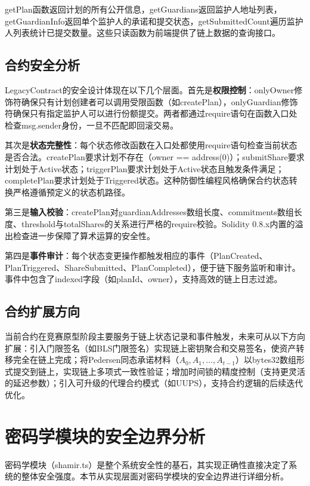 \documentclass[UTF8,a4paper,zihao=-4,openany]{ctexrep}
\begin{document}
getPlan函数返回计划的所有公开信息，getGuardians返回监护人地址列表，getGuardianInfo返回单个监护人的承诺和提交状态，getSubmittedCount遍历监护人列表统计已提交数量。这些只读函数为前端提供了链上数据的查询接口。

\subsection{合约安全分析}

LegacyContract的安全设计体现在以下几个层面。首先是\textbf{权限控制}：onlyOwner修饰符确保只有计划创建者可以调用受限函数（如createPlan），onlyGuardian修饰符确保只有指定监护人可以进行份额提交。两者都通过require语句在函数入口处检查msg.sender身份，一旦不匹配即回滚交易。

其次是\textbf{状态完整性}：每个状态修改函数在入口处都使用require语句检查当前状态是否合法。createPlan要求计划不存在（owner == address(0)）；submitShare要求计划处于Active状态；triggerPlan要求计划处于Active状态且触发条件满足；completePlan要求计划处于Triggered状态。这种防御性编程风格确保合约状态转换严格遵循预定义的状态机路径。

第三是\textbf{输入校验}：createPlan对guardianAddresses数组长度、commitments数组长度、threshold与totalShares的关系进行严格的require校验。Solidity 0.8.x内置的溢出检查进一步保障了算术运算的安全性。

第四是\textbf{事件审计}：每个状态变更操作都触发相应的事件（PlanCreated、PlanTriggered、ShareSubmitted、PlanCompleted），便于链下服务监听和审计。事件中包含了indexed字段（如planId、owner），支持高效的链上日志过滤。

\subsection{合约扩展方向}

当前合约在竞赛原型阶段主要服务于链上状态记录和事件触发，未来可从以下方向扩展：引入门限签名（如BLS门限签名）实现链上密钥聚合和交易签名，使资产转移完全在链上完成；将Pedersen同态承诺材料（$A_0, A_1, \dots, A_{t-1}$）以bytes32数组形式提交到链上，实现链上多项式一致性验证；增加时间锁的精度控制（支持更灵活的延迟参数）；引入可升级的代理合约模式（如UUPS），支持合约逻辑的后续迭代优化。

\section{密码学模块的安全边界分析}

密码学模块（shamir.ts）是整个系统安全性的基石，其实现正确性直接决定了系统的整体安全强度。本节从实现层面对密码学模块的安全边界进行详细分析。
\end{document}
